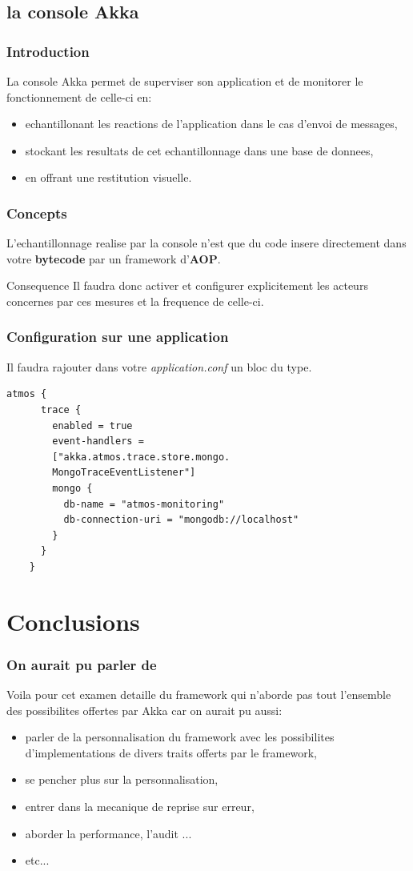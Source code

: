 \documentclass[xcolor=dvipsnames]{beamer}
\begin{document}
\subsection{la console Akka}
\begin{frame}
  \frametitle{Introduction}
  La console Akka permet de superviser son application et de monitorer le fonctionnement de celle-ci en:
  \begin{itemize}
  \item echantillonant les reactions de l'application dans le cas d'envoi de messages,
  \item stockant les resultats de cet echantillonnage dans une base de donnees,
  \item en offrant une restitution visuelle.
  \end{itemize}
\end{frame}

\begin{frame}
  \frametitle{Concepts}
  L'echantillonnage realise par la console n'est que du code insere
  directement dans votre \textbf{bytecode} par un framework d'\textbf{AOP}.
  \begin{alertblock}{Consequence}
  Il faudra donc activer et configurer explicitement les acteurs
  concernes par ces mesures et la frequence de celle-ci.
\end{alertblock}
\end{frame}

\begin{frame}[fragile]
  \frametitle{Configuration sur une application}
  Il faudra rajouter dans votre \textit{application.conf} un bloc du type.
  \begin{lstlisting}[frame=trBL]
      atmos {
      trace {
        enabled = true
        event-handlers =
        ["akka.atmos.trace.store.mongo.
        MongoTraceEventListener"]
        mongo {
          db-name = "atmos-monitoring"
          db-connection-uri = "mongodb://localhost"
        }
      }
    }
  \end{lstlisting}
\end{frame}

\section{Conclusions}
\begin{frame}
  \frametitle{On aurait pu parler de}
  Voila pour cet examen detaille du framework qui n'aborde pas
  tout l'ensemble des possibilites offertes par Akka car on aurait
  pu aussi:
  \begin{itemize}
  \item parler de la personnalisation du framework avec les possibilites d'implementations de divers traits offerts par le framework,
  \item se pencher plus sur la personnalisation,
  \item entrer dans la mecanique de reprise sur erreur,
  \item aborder la performance, l'audit ...
  \item etc...
  \end{itemize}
\end{frame}
\end{document}
